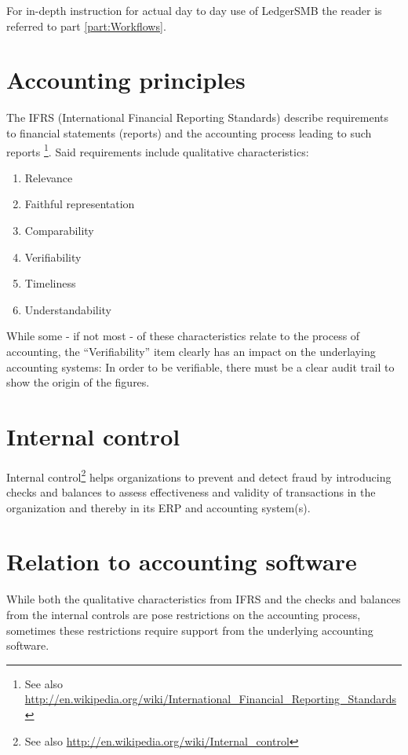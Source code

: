 For in-depth instruction for actual day to day use of LedgerSMB the reader is referred
to part \ref{part:Workflows}.


\section{Accounting principles}

The IFRS (International Financial Reporting Standards) describe requirements
to financial statements (reports) and the accounting process leading to such
reports \footnote{See also \url{http://en.wikipedia.org/wiki/International\_Financial\_Reporting\_Standards}}.
Said requirements include qualitative characteristics:

\begin{enumerate}
\item Relevance
\item Faithful representation
\item Comparability
\item Verifiability
\item Timeliness
\item Understandability
\end{enumerate}

While some - if not most - of these characteristics relate to the process of accounting,
the ``Verifiability'' item clearly has an impact on the underlaying accounting systems:
In order to be verifiable, there must be a clear audit trail to show the origin of the
figures.

\section{Internal control}

Internal control\footnote{See also \url{http://en.wikipedia.org/wiki/Internal\_control}}
helps organizations to prevent and detect fraud by introducing checks and balances
to assess effectiveness and validity of transactions in the organization and thereby
in its ERP and accounting system(s).


\section{Relation to accounting software}

While both the qualitative characteristics from IFRS and the checks and balances
from the internal controls are pose restrictions on the accounting process,
sometimes these restrictions require support from the underlying accounting
software.

